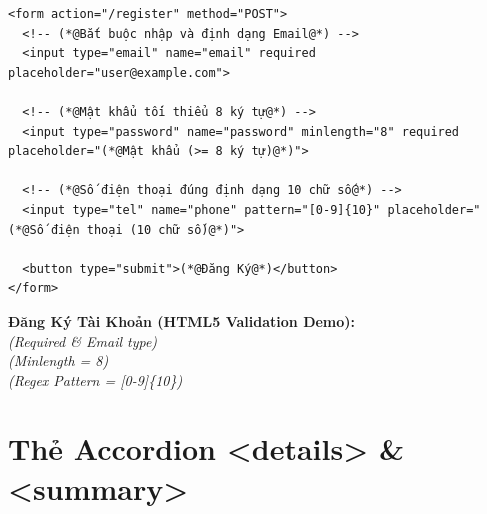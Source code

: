 \documentclass[11pt,oneside]{book}
\begin{document}
\begin{codeWindow}
\begin{lstlisting}[language=HTML5]
<form action="/register" method="POST">
  <!-- (*@Bắt buộc nhập và định dạng Email@*) -->
  <input type="email" name="email" required placeholder="user@example.com">
  
  <!-- (*@Mật khẩu tối thiểu 8 ký tự@*) -->
  <input type="password" name="password" minlength="8" required placeholder="(*@Mật khẩu (>= 8 ký tự)@*)">
  
  <!-- (*@Số điện thoại đúng định dạng 10 chữ số@*) -->
  <input type="tel" name="phone" pattern="[0-9]{10}" placeholder="(*@Số điện thoại (10 chữ số)@*)">
  
  <button type="submit">(*@Đăng Ký@*)</button>
</form>
\end{lstlisting}
\end{codeWindow}

\begin{browserWindow}
\sffamily\small
\textbf{Đăng Ký Tài Khoản (HTML5 Validation Demo):} \\[6pt]
 \quad \textcolor{codeComment}{\small\textit{(Required \& Email type)}} \\[4pt]
 \quad \textcolor{codeComment}{\small\textit{(Minlength = 8)}} \\[4pt]
 \quad \textcolor{codeComment}{\small\textit{(Regex Pattern = [0-9]\{10\})}} \\[8pt]
\end{browserWindow}

\section{Thẻ Accordion <details> \& <summary>}
\label{sec:details_summary}
\end{document}
